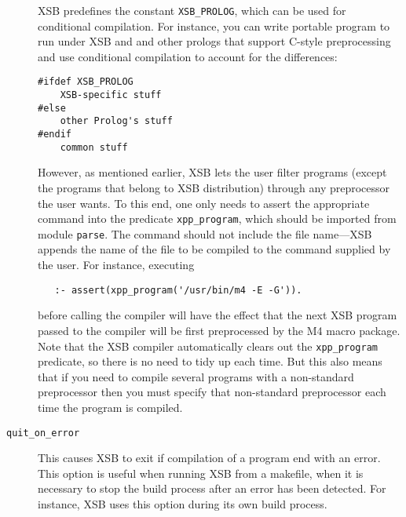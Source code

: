 \begin{description}
  XSB predefines the constant {\tt XSB\_PROLOG}, which can be used for
  conditional compilation. For instance, you can write portable program
  to run under XSB and and other prologs that support C-style
  preprocessing and use conditional compilation to account for the
  differences: 
  \begin{samepage}
  \begin{verbatim}
#ifdef XSB_PROLOG
    XSB-specific stuff
#else
    other Prolog's stuff
#endif
    common stuff
  \end{verbatim}
  \end{samepage}

  However, as mentioned earlier, XSB lets the user filter programs (except
  the programs that belong to XSB distribution) through any preprocessor
  the user wants. To this end, one only needs to assert the appropriate
  command into the predicate \verb|xpp_program|, which should be imported
  from module {\tt parse}. The command should not include the file
  name---XSB appends the name of the file to be compiled to the command
  supplied by the user. For instance, executing
  \begin{verbatim}
   :- assert(xpp_program('/usr/bin/m4 -E -G')).
  \end{verbatim}
  before calling the compiler will have the effect that the next XSB
  program passed to the compiler will be first preprocessed by the M4 macro
  package. Note that the XSB compiler automatically clears out the
  {\tt xpp\_program} predicate, so there is no need to tidy up each time.
  But this also means that if you need to compile several programs with a
  non-standard preprocessor then you must specify that non-standard
  preprocessor each time the program is compiled.

\item[{\tt quit\_on\_error}] 
  This causes XSB to exit if compilation of a program end with an error.
  This option is useful when running XSB from a makefile, when it is
  necessary to stop the build process after an error has been detected. For
  instance, XSB uses this option during its own build process.



\end{description}
